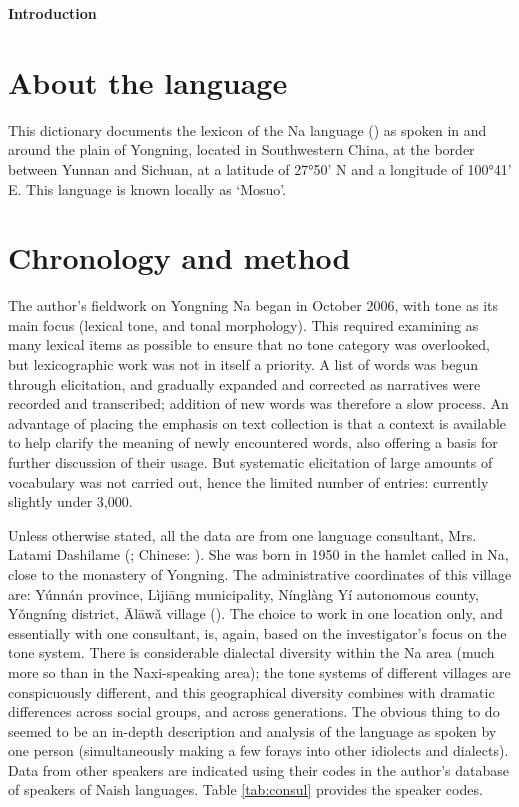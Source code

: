 	{\LARGE \textbf{Introduction}}
	\section{About the language} \label{sec:language}

This dictionary documents the lexicon of the Na language () as spoken in and around the plain of Yongning, located in Southwestern China, at the border between Yunnan and Sichuan, at a latitude of 27°50’ N and a longitude of 100°41’ E. This language is known locally as ‘Mosuo'. 

	\section{Chronology and method} \label{sec:method}

The author's fieldwork on Yongning Na began in October 2006, with tone as its main focus (lexical tone, and tonal morphology). This required examining as many lexical items as possible to ensure that no tone category was overlooked, but lexicographic work was not in itself a priority. A list of words was begun through elicitation, and gradually expanded and corrected as narratives were recorded and transcribed; addition of new words was therefore a slow process. An advantage of placing the emphasis on text collection is that a context is available to help clarify the meaning of newly encountered words, also offering a basis for further discussion of their usage. But systematic elicitation of large amounts of vocabulary was not carried out, hence the limited number of entries: currently slightly under 3,000. 

Unless otherwise stated, all the data are from one language consultant, Mrs. Latami Dashilame (; Chinese: ). She was born in 1950 in the hamlet called  in Na, close to the monastery of Yongning. The administrative coordinates of this village are: Yúnnán province, Lìjiāng municipality, Nínglàng Yí autonomous county, Yǒngníng district, Ālāwǎ village (). The choice to work in one location only, and essentially with one consultant, is, again, based on the investigator's focus on the tone system. There is considerable dialectal diversity within the Na area (much more so than in the Naxi-speaking area); the tone systems of different villages are conspicuously different, and this geographical diversity combines with dramatic differences across social groups, and across generations. The obvious thing to do seemed to be an in-depth description and analysis of the language as spoken by one person (simultaneously making a few forays into other idiolects and dialects). Data from other speakers are indicated using their codes in the author's database of speakers of Naish languages. Table \ref{tab:consul} provides the speaker codes.

